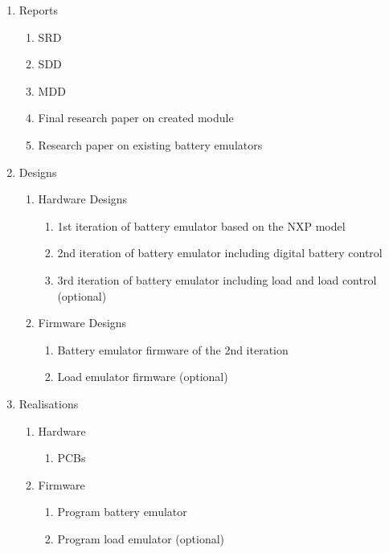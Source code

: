 

\begin{enumerate}
    \item Reports
    \begin{enumerate}
        \item SRD
        \item SDD
        \item MDD
        \item Final research paper on created module
        \item Research paper on existing battery emulators
    \end{enumerate}
    \item Designs
    \begin{enumerate}
        \item Hardware Designs
        \begin{enumerate}
            \item 1st iteration of battery emulator based on the NXP model
            \item 2nd iteration of battery emulator including digital battery control 
            \item 3rd iteration of battery emulator including load and load control (optional)
        \end{enumerate}
        \item Firmware Designs
        \begin{enumerate}
            \item Battery emulator firmware of the 2nd iteration
            \item Load emulator firmware (optional)
        \end{enumerate}
    \end{enumerate}
    \item Realisations
    \begin{enumerate}
        \item Hardware
        \begin{enumerate}
            \item PCBs
        \end{enumerate}
        \item Firmware
        \begin{enumerate}
            \item Program battery emulator
            \item Program load emulator (optional)
        \end{enumerate}
    \end{enumerate}
\end{enumerate}
